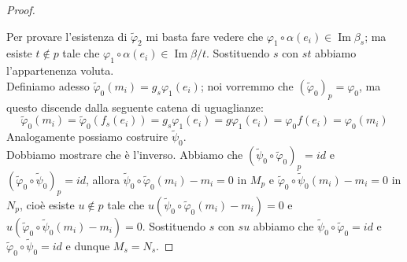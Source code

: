 \documentclass[a4paper,11pt,oneside]{book}
\DeclareMathOperator{\Imm}{Im}
\theoremstyle{definition}
\begin{document}
\begin{proof}
\begin{center}
    \end{center}
    Per provare l'esistenza di $\tilde \varphi_2$ mi basta fare vedere che $\varphi_1\circ \alpha (e_i)\in\Imm \beta_s$;
    ma esiste $t\notin p$ tale che $\varphi_1\circ \alpha (e_i)\in \Imm \beta / t$. Sostituendo $s$ con $st$ abbiamo l'appartenenza voluta.\\
    Definiamo adesso $\tilde\varphi_0(m_i)=g_s\varphi_1(e_i)$; noi vorremmo che $(\tilde\varphi_0)_p=\varphi_0$, ma questo discende 
    dalla seguente catena di uguaglianze:
    \[
     \tilde\varphi_0(m_i)=\tilde\varphi_0(f_s(e_i))=g_s\varphi_1(e_i)=g\varphi_1(e_i)=\varphi_0f(e_i)=\varphi_0(m_i)
    \]
    Analogamente possiamo costruire $\tilde\psi_0$.\\
    Dobbiamo mostrare che è l'inverso. Abbiamo che $(\tilde\psi_0\circ\tilde\varphi_0)_p=id$ e 
    $(\tilde\varphi_0\circ\tilde\psi_0)_p=id$, allora $\tilde\psi_0\circ\tilde\varphi_0 (m_i)-m_i=0$ in $M_p$ e
    $\tilde\varphi_0\circ\tilde\psi_0 (m_i)-m_i=0$ in $N_p$, cioè esiste $u\notin p$ tale che $u(\tilde\psi_0\circ\tilde
    \varphi_0 (m_i)-m_i)=0$ e
    $u(\tilde\varphi_0\circ\tilde\psi_0 (m_i)-m_i)=0$. Sostituendo $s$ con $su$ abbiamo che
    $\tilde\psi_0\circ\tilde\varphi_0=id$ e $\tilde\varphi_0\circ\tilde\psi_0=id$ e dunque $M_s=N_s$.
 \end{proof}
 
\end{document}
